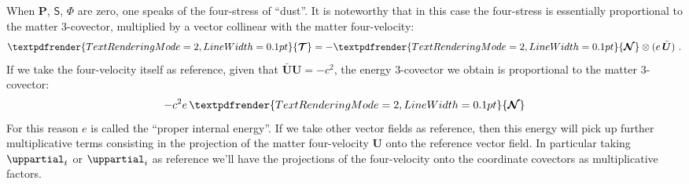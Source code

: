 \documentclass[a4paper,12pt,%
onecolumn,oneside,article,%
british%
]{memoir}
\theoremstyle{remark}
\theoremstyle{innote}
\newcommand*{\mathte}[1]{\bm{\mathsf{#1}}}
\newcommand*{\xbm}[1]{\textpdfrender{TextRenderingMode=2,LineWidth=0.1pt}{\boldsymbol{#1}}}
\newcommand*{\de}{\mathop{}\!\uppartial}%
\renewcommand*{\|}[1][]{\nonscript\:#1\vert\nonscript\:\mathopen{}}
\newcommand*{\yN}{\xbm{\mathcal{N}}}
\newcommand*{\yP}{\bm{P}}
\newcommand*{\yH}{\bm{\varPhi}}
\newcommand*{\yS}{\mathte{S}}
\newcommand*{\yTT}{\xbm{\mathcal{T}}}
\newcommand*{\ye}{e}
\newcommand*{\yU}{\bm{U}}
\newcommand*{\yUd}{\bar{\bm{U}}}
\begin{document}
When $\yP$, $\yS$, $\yH$ are zero, one speaks of the four-stress of \enquote{dust}. It is noteworthy that in this case the four-stress is essentially proportional to the matter 3-covector, multiplied by a vector collinear with the matter four-velocity:
\begin{equation}
  \label{eq:4stress_dust}
  \yTT = -\yN \otimes (\ye\,\yUd) \ .
\end{equation}
If we take the four-velocity itself as reference, given that $\yUd\yU = -c^{2}$, the energy 3-covector we obtain is proportional to the matter 3-covector:
\begin{equation}
  \label{eq:energy_dust}
  -c^{2}\ye\,\yN
\end{equation}
For this reason $\ye$ is called the \enquote{proper internal energy}. If we take other vector fields as reference, then this energy will pick up further multiplicative terms consisting in the projection of the matter four-velocity $\yU$ onto the reference vector field. In particular taking $\de_{t}$ or $\de_{i}$ as reference we'll have the projections of the four-velocity onto the coordinate covectors as multiplicative factors.
\end{document}
